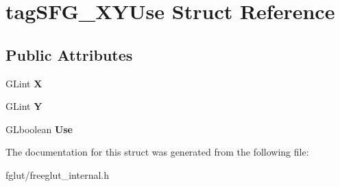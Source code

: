 \hypertarget{structtag_s_f_g___x_y_use}{}\section{tag\+S\+F\+G\+\_\+\+X\+Y\+Use Struct Reference}
\label{structtag_s_f_g___x_y_use}
\subsection*{Public Attributes}
\begin{DoxyCompactItemize}
\item 
G\+Lint {\bfseries X}\hypertarget{structtag_s_f_g___x_y_use_a28b477243fec705bf73f533a2b22666a}{}\label{structtag_s_f_g___x_y_use_a28b477243fec705bf73f533a2b22666a}

\item 
G\+Lint {\bfseries Y}\hypertarget{structtag_s_f_g___x_y_use_a027d624f76701b43bbaf2d9fbeee5405}{}\label{structtag_s_f_g___x_y_use_a027d624f76701b43bbaf2d9fbeee5405}

\item 
G\+Lboolean {\bfseries Use}\hypertarget{structtag_s_f_g___x_y_use_ae39c8826313d0a01453f2a0255fae31b}{}\label{structtag_s_f_g___x_y_use_ae39c8826313d0a01453f2a0255fae31b}

\end{DoxyCompactItemize}


The documentation for this struct was generated from the following file\+:\begin{DoxyCompactItemize}
\item 
fglut/freeglut\+\_\+internal.\+h\end{DoxyCompactItemize}
